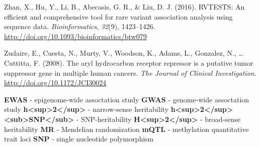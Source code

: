 \documentclass[11pt,twoside]{bristolthesis}
\newlength{\cslhangindent}
\newenvironment{cslreferences}%
  {\setlength{\parindent}{0pt}%
  \everypar{\setlength{\hangindent}{\cslhangindent}}\ignorespaces}%
  {\par}
\begin{document}
\begin{cslreferences}
\leavevmode\hypertarget{ref-Zhan2016}{}%
Zhan, X., Hu, Y., Li, B., Abecasis, G. R., \& Liu, D. J. (2016). RVTESTS: An efficient and comprehensive tool for rare variant association analysis using sequence data. \emph{Bioinformatics}, \emph{32}(9), 1423--1426. \url{http://doi.org/10.1093/bioinformatics/btw079}

\leavevmode\hypertarget{ref-Zudaire2008}{}%
Zudaire, E., Cuesta, N., Murty, V., Woodson, K., Adams, L., Gonzalez, N., \ldots{} Cuttitta, F. (2008). The aryl hydrocarbon receptor repressor is a putative tumor suppressor gene in multiple human cancers. \emph{The Journal of Clinical Investigation}. \url{http://doi.org/10.1172/JCI30024}
\end{cslreferences}
  \begin{abbreviations}
    \textbf{EWAS} - epigenome-wide assoctation study
    \textbf{GWAS} - genome-wide assoctation study
    \textbf{h<sup>2</sup>} - narrow-sense heritability
    \textbf{h<sup>2</sup><sub>SNP</sub>} - SNP-heritability
    \textbf{H<sup>2</sup>} - broad-sense heritability
    \textbf{MR} - Mendelian randomization
    \textbf{mQTL} - methylation quantitative trait loci
    \textbf{SNP} - single nucleotide polymorphism
  \end{abbreviations}
\end{document}
